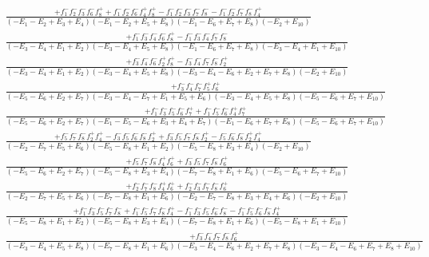 \documentclass{article}
\begin{document}
\[\begin{array}{rcl}
\frac{+f_{1}^{-}f_{2}^{-}f_{3}^{-}f_{6}^{-}f_{8}^{+}+f_{1}^{-}f_{2}^{-}f_{6}^{-}f_{4}^{+}f_{8}^{+}-f_{1}^{-}f_{2}^{-}f_{3}^{-}f_{7}^{-}f_{8}^{-}-f_{1}^{-}f_{2}^{-}f_{7}^{-}f_{8}^{-}f_{4}^{+}}{(-E_{1}-E_{2}+E_{3}+E_{4})(-E_{1}-E_{2}+E_{5}+E_{8})(-E_{1}-E_{6}+E_{7}+E_{8})(-E_{2}+E_{10})}\\
\frac{+f_{1}^{-}f_{3}^{-}f_{4}^{-}f_{6}^{-}f_{8}^{+}-f_{1}^{-}f_{3}^{-}f_{4}^{-}f_{7}^{-}f_{8}^{-}}{(-E_{3}-E_{4}+E_{1}+E_{2})(-E_{3}-E_{4}+E_{5}+E_{8})(-E_{1}-E_{6}+E_{7}+E_{8})(-E_{3}-E_{4}+E_{1}+E_{10})}\\
\frac{+f_{3}^{-}f_{4}^{-}f_{6}^{-}f_{2}^{+}f_{8}^{+}-f_{3}^{-}f_{4}^{-}f_{7}^{-}f_{8}^{-}f_{2}^{+}}{(-E_{3}-E_{4}+E_{1}+E_{2})(-E_{3}-E_{4}+E_{5}+E_{8})(-E_{3}-E_{4}-E_{6}+E_{2}+E_{7}+E_{8})(-E_{2}+E_{10})}\\
\frac{+f_{3}^{-}f_{4}^{-}f_{7}^{-}f_{5}^{+}f_{6}^{+}}{(-E_{5}-E_{6}+E_{2}+E_{7})(-E_{3}-E_{4}-E_{7}+E_{1}+E_{5}+E_{6})(-E_{3}-E_{4}+E_{5}+E_{8})(-E_{5}-E_{6}+E_{7}+E_{10})}\\
\frac{+f_{1}^{-}f_{3}^{-}f_{5}^{-}f_{6}^{-}f_{7}^{+}+f_{1}^{-}f_{5}^{-}f_{6}^{-}f_{4}^{+}f_{7}^{+}}{(-E_{5}-E_{6}+E_{2}+E_{7})(-E_{1}-E_{5}-E_{6}+E_{3}+E_{4}+E_{7})(-E_{1}-E_{6}+E_{7}+E_{8})(-E_{5}-E_{6}+E_{7}+E_{10})}\\
\frac{+f_{5}^{-}f_{7}^{-}f_{8}^{-}f_{2}^{+}f_{4}^{+}-f_{3}^{-}f_{5}^{-}f_{6}^{-}f_{8}^{-}f_{2}^{+}+f_{3}^{-}f_{5}^{-}f_{7}^{-}f_{8}^{-}f_{2}^{+}-f_{5}^{-}f_{6}^{-}f_{8}^{-}f_{2}^{+}f_{4}^{+}}{(-E_{2}-E_{7}+E_{5}+E_{6})(-E_{5}-E_{8}+E_{1}+E_{2})(-E_{5}-E_{8}+E_{3}+E_{4})(-E_{2}+E_{10})}\\
\frac{+f_{5}^{-}f_{7}^{-}f_{8}^{-}f_{4}^{+}f_{6}^{+}+f_{3}^{-}f_{5}^{-}f_{7}^{-}f_{8}^{-}f_{6}^{+}}{(-E_{5}-E_{6}+E_{2}+E_{7})(-E_{5}-E_{8}+E_{3}+E_{4})(-E_{7}-E_{8}+E_{1}+E_{6})(-E_{5}-E_{6}+E_{7}+E_{10})}\\
\frac{+f_{2}^{-}f_{7}^{-}f_{8}^{-}f_{4}^{+}f_{6}^{+}+f_{2}^{-}f_{3}^{-}f_{7}^{-}f_{8}^{-}f_{6}^{+}}{(-E_{2}-E_{7}+E_{5}+E_{6})(-E_{7}-E_{8}+E_{1}+E_{6})(-E_{2}-E_{7}-E_{8}+E_{3}+E_{4}+E_{6})(-E_{2}+E_{10})}\\
\frac{+f_{1}^{-}f_{3}^{-}f_{5}^{-}f_{7}^{-}f_{8}^{-}+f_{1}^{-}f_{5}^{-}f_{7}^{-}f_{8}^{-}f_{4}^{+}-f_{1}^{-}f_{3}^{-}f_{5}^{-}f_{6}^{-}f_{8}^{-}-f_{1}^{-}f_{5}^{-}f_{6}^{-}f_{8}^{-}f_{4}^{+}}{(-E_{5}-E_{8}+E_{1}+E_{2})(-E_{5}-E_{8}+E_{3}+E_{4})(-E_{7}-E_{8}+E_{1}+E_{6})(-E_{5}-E_{8}+E_{1}+E_{10})}\\
\frac{+f_{3}^{-}f_{4}^{-}f_{7}^{-}f_{8}^{-}f_{6}^{+}}{(-E_{3}-E_{4}+E_{5}+E_{8})(-E_{7}-E_{8}+E_{1}+E_{6})(-E_{3}-E_{4}-E_{6}+E_{2}+E_{7}+E_{8})(-E_{3}-E_{4}-E_{6}+E_{7}+E_{8}+E_{10})}\\

\end{array}\]
\end{document}
